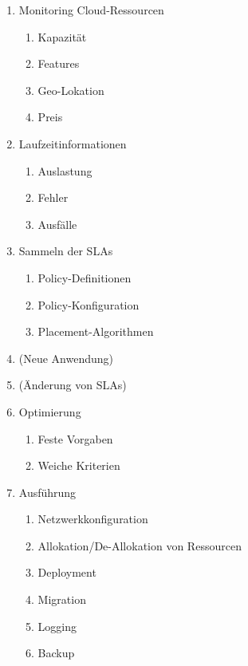 \begin{minipage}[b]{0.45\linewidth}
\begin{flushleft}
\begin{enumerate}
\item Monitoring Cloud-Ressourcen
\begin{enumerate}
	\item Kapazität%
	\item Features%
	\item Geo-Lokation
	\item Preis
\end{enumerate}
\item Laufzeitinformationen%
\begin{enumerate}
	\item Auslastung
	\item Fehler
	\item Ausfälle
\end{enumerate}
\item Sammeln der SLAs
\begin{enumerate}
	\item Policy-Definitionen
	\item Policy-Konfiguration
	\item Placement-Algorithmen
\end{enumerate}
\end{enumerate}
\end{flushleft}
\end{minipage}
%
\hspace{0.5cm}
%
\begin{minipage}[b]{0.45\linewidth}	
\begin{enumerate}
\setcounter{enumi}{3}
\item (Neue Anwendung)
\item (Änderung von SLAs)
\item Optimierung
\begin{enumerate}
	\item Feste Vorgaben%
	\item Weiche Kriterien%
\end{enumerate}
\item Ausführung
\begin{enumerate}
	\item Netzwerkkonfiguration
	\item Allokation/De-Allokation von Ressourcen
	\item Deployment
	\item Migration
	\item Logging%
	\item Backup
\end{enumerate}
\end{enumerate}
\end{minipage}

	
